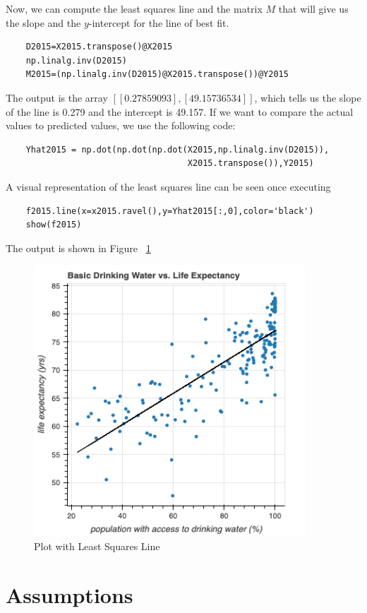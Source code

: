 \documentclass[12pt]{article}
\begin{document}
Now, we can compute the least squares line and the matrix $M$ that will give us the slope and the $y$-intercept for the line of best fit.
\begin{verbatim}
    D2015=X2015.transpose()@X2015
    np.linalg.inv(D2015)
    M2015=(np.linalg.inv(D2015)@X2015.transpose())@Y2015
\end{verbatim}

The output is the array $[[0.27859093],[49.15736534]]$, which tells us the slope of the line is 0.279 and the intercept is 49.157. If we want to compare the actual values to predicted values, we use the following code:
\begin{verbatim}
    Yhat2015 = np.dot(np.dot(np.dot(X2015,np.linalg.inv(D2015)),
                                    X2015.transpose()),Y2015)
\end{verbatim}

A visual representation of the least squares line can be seen once executing
\begin{verbatim}
    f2015.line(x=x2015.ravel(),y=Yhat2015[:,0],color='black')
    show(f2015)
\end{verbatim}
The output is shown in Figure ~\ref{fig4}
\begin{figure}
    \centering
    \includegraphics[width=4in]{Figures/figure2.png}
    \caption{Plot with Least Squares Line}
    \label{fig4}
\end{figure}

\section*{Assumptions}
\end{document}
